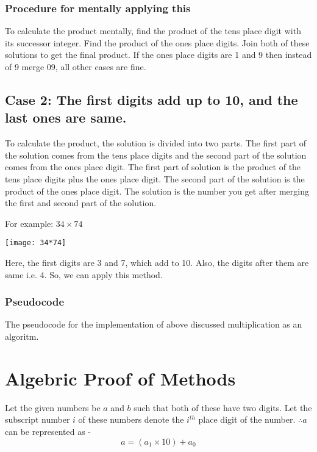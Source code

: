 \documentclass[12pt]{article}
\begin{document}
\subsubsection{Procedure for mentally applying this}
To calculate the product mentally, find the product of the tens place digit with its successor integer. Find the product of the ones place digits. Join both of these solutions to get the final product. If the ones place digits are 1 and 9 then instead of 9 merge 09, all other cases are fine.

\subsection{Case 2: The first digits add up to 10, and the last ones are same.}

To calculate the product, the solution is divided into two parts. The first part of the solution comes from the tens place digits and the second part of the solution comes from the ones place digit. The first part of solution is the product of the tens place digits plus the ones place digit. The second part of the solution is the product of the ones place digit. The solution is the number you get after merging the first and second part of the solution.~\cite{mul2}

\vspace{5mm}

\hspace{-17pt}For example: $34 \times 74$\newline
\begin{center}
\texttt{[image: 34*74]}\newline
\end{center}

\hspace{-17pt}Here, the first digits are 3 and 7, which add to 10. Also, the digits after them are same i.e. 4. So,
we can apply this method.



\subsubsection{Pseudocode}
The pseudocode for the implementation of above discussed multiplication as an algoritm.


\section{Algebric Proof of Methods}
Let the given numbers be $a$ and $b$ such that both of these have two digits. Let the subscript number $i$ of these numbers denote the $i^{th}$ place digit of the number.\newline
$\therefore a$ can be represented as - 
$$a = (a_1 \times 10) + a_0$$
\end{document}

